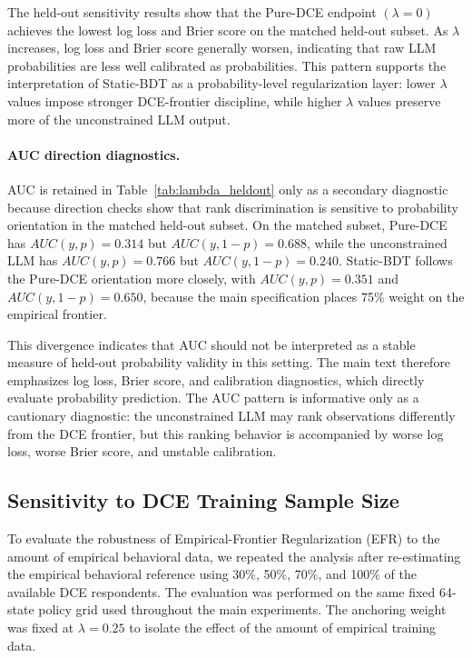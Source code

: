 \documentclass[11pt]{article}
\begin{document}
The held-out sensitivity results show that the Pure-DCE endpoint \((\lambda=0)\) achieves the lowest log loss and Brier score on the matched held-out subset. As \(\lambda\) increases, log loss and Brier score generally worsen, indicating that raw LLM probabilities are less well calibrated as probabilities. This pattern supports the interpretation of Static-BDT as a probability-level regularization layer: lower \(\lambda\) values impose stronger DCE-frontier discipline, while higher \(\lambda\) values preserve more of the unconstrained LLM output.

\paragraph{AUC direction diagnostics.}

AUC is retained in Table~\ref{tab:lambda_heldout} only as a secondary diagnostic because direction checks show that rank discrimination is sensitive to probability orientation in the matched held-out subset. On the matched subset, Pure-DCE has \(AUC(y,p)=0.314\) but \(AUC(y,1-p)=0.688\), while the unconstrained LLM has \(AUC(y,p)=0.766\) but \(AUC(y,1-p)=0.240\). Static-BDT follows the Pure-DCE orientation more closely, with \(AUC(y,p)=0.351\) and \(AUC(y,1-p)=0.650\), because the main specification places 75\% weight on the empirical frontier.

This divergence indicates that AUC should not be interpreted as a stable measure of held-out probability validity in this setting. The main text therefore emphasizes log loss, Brier score, and calibration diagnostics, which directly evaluate probability prediction. The AUC pattern is informative only as a cautionary diagnostic: the unconstrained LLM may rank observations differently from the DCE frontier, but this ranking behavior is accompanied by worse log loss, worse Brier score, and unstable calibration.

\subsection{Sensitivity to DCE Training Sample Size}
\label{app:dce_sample_sensitivity}

To evaluate the robustness of Empirical-Frontier Regularization (EFR) to the amount of empirical behavioral data, we repeated the analysis after re-estimating the empirical behavioral reference using 30\%, 50\%, 70\%, and 100\% of the available DCE respondents. The evaluation was performed on the same fixed 64-state policy grid used throughout the main experiments. The anchoring weight was fixed at $\lambda=0.25$ to isolate the effect of the amount of empirical training data.
\end{document}
